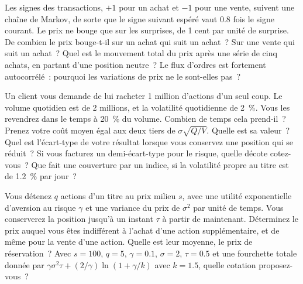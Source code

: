 \begin{question}\label{iq:iv2:markets-and-microstructure:37}
Les signes des transactions, $+1$ pour un achat et $-1$ pour une vente, suivent une chaîne de Markov, de sorte que le signe suivant espéré vaut 0.8 fois le signe courant. Le prix ne bouge que sur les surprises, de 1 cent par unité de surprise. De combien le prix bouge-t-il sur un achat qui suit un achat~? Sur une vente qui suit un achat~? Quel est le mouvement total du prix après une série de cinq achats, en partant d'une position neutre~? Le flux d'ordres est fortement autocorrélé~: pourquoi les variations de prix ne le sont-elles pas~?
\end{question}

\begin{question}\label{iq:iv2:markets-and-microstructure:38}
Un client vous demande de lui racheter 1 million d'actions d'un seul coup. Le volume quotidien est de 2 millions, et la volatilité quotidienne de 2~\%. Vous les revendrez dans le temps à 20~\% du volume. Combien de temps cela prend-il~? Prenez votre coût moyen égal aux deux tiers de $\sigma\sqrt{Q/V}$. Quelle est sa valeur~? Quel est l'écart-type de votre résultat lorsque vous conservez une position qui se réduit~? Si vous facturez un demi-écart-type pour le risque, quelle décote cotez-vous~? Que fait une couverture par un indice, si la volatilité propre au titre est de 1.2~\% par jour~?
\end{question}

\begin{question}\label{iq:iv2:markets-and-microstructure:39}
Vous détenez $q$ actions d'un titre au prix milieu $s$, avec une utilité exponentielle d'aversion au risque $\gamma$ et une variance du prix de $\sigma^2$ par unité de temps. Vous conserverez la position jusqu'à un instant $\tau$ à partir de maintenant. Déterminez le prix auquel vous êtes indifférent à l'achat d'une action supplémentaire, et de même pour la vente d'une action. Quelle est leur moyenne, le prix de réservation~? Avec $s = 100$, $q = 5$, $\gamma = 0.1$, $\sigma = 2$, $\tau = 0.5$ et une fourchette totale donnée par $\gamma\sigma^2\tau + (2/\gamma)\ln(1 + \gamma/k)$ avec $k = 1.5$, quelle cotation proposez-vous~?
\end{question}

